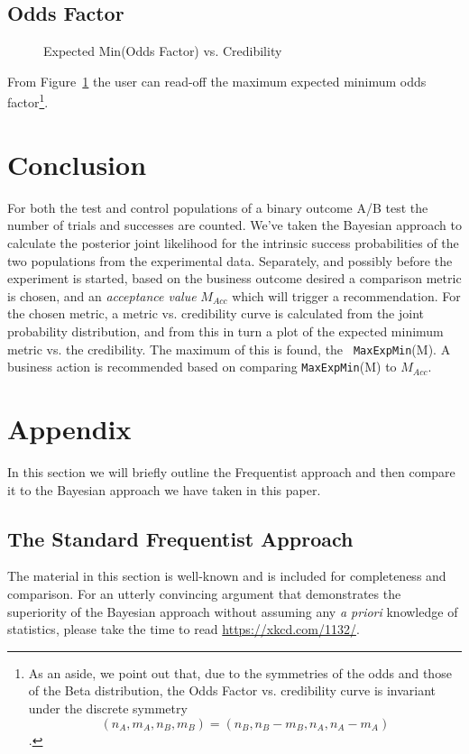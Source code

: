 \documentclass[letterpaper,12pt]{article}
\newcommand{\bdm}{\begin{displaymath}} %
\newcommand{\edm}{\end{displaymath}} %
\begin{document}
\subsection{Odds Factor}
\label{sec:odds-factor-result}
\begin{figure}[ht!]
\centering
\caption{Expected Min(Odds Factor) vs. Credibility
  \label{fig:exp_oddsfactor_vs_cred}}
\end{figure}
From Figure~\ref{fig:exp_oddsfactor_vs_cred} the user can read-off the
maximum expected minimum odds factor\footnote{As an aside, we point
  out that, due to the symmetries of the odds and those of the Beta
  distribution, the Odds Factor vs. credibility curve is invariant
  under the discrete symmetry
\bdm
(n_A, m_A, n_B, m_B) = (n_B, n_B - m_B, n_A, n_A - m_A)
\edm.}.

\section{Conclusion}

For both the test and control populations of a binary outcome A/B test
the number of trials and successes are counted. We've taken the
Bayesian approach to calculate the posterior joint likelihood for the intrinsic success probabilities of the two
populations from the experimental data. Separately, and possibly
before the experiment is started, based on the business outcome
desired a comparison metric is chosen, and an {\em acceptance value}
\(M_{Acc}\) which will trigger a recommendation. For the chosen metric, a metric
vs. credibility curve is calculated from the joint probability
distribution, and from this in turn a plot of the expected minimum
metric vs. the credibility. The maximum of this is found, the {\tt
  MaxExpMin}(M). A business action is recommended based on comparing
{\tt MaxExpMin}(M) to \(M_{Acc}\).

\section{Appendix}\label{sec:app_frequentist}
In this section we will briefly outline the Frequentist approach and
then compare it to the Bayesian approach we have taken in this paper.

\subsection{The Standard Frequentist Approach}\label{sec:frequentist}
The material in this section is well-known and is included for completeness
and comparison. For an utterly convincing argument that demonstrates the
superiority of the Bayesian approach without assuming any {\em a priori}
knowledge of statistics, please take the time to read
\url{https://xkcd.com/1132/}.
\end{document}
